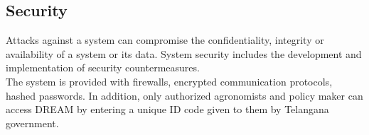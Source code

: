 \subsection{Security}

Attacks against a system can compromise the confidentiality, integrity or availability of a system or its data.
System security includes the development and implementation of security countermeasures.\\ The system is provided with firewalls, encrypted communication protocols, hashed passwords.
In addition, only authorized agronomists and policy maker can access DREAM by entering a unique ID code given to them by Telangana government.